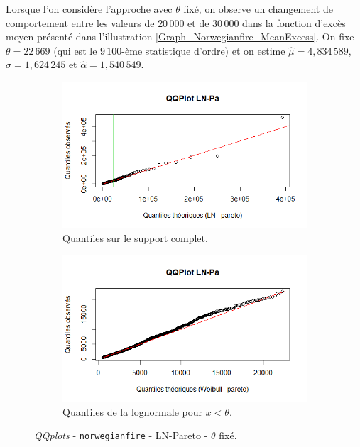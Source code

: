 		Lorsque l'on considère l'approche avec $\theta$ fixé, on observe un changement de comportement entre les valeurs de $20\,000$ et de $30\,000$ dans la fonction d'excès moyen présenté dans l'illustration \ref{Graph_Norwegianfire_MeanExcess}. On fixe $\theta = 22\,669$ (qui est le $9\,100$-ème statistique d'ordre) et on estime $\hat{\mu} =4,834\,589$, $\hat{\sigma}=1,624\,245$ et $\hat{\alpha} = 1,540\,549$.
		
		\begin{figure}[H]
			\begin{center}
				\begin{subfigure}[b]{0.45\textwidth}
					\includegraphics[scale=0.54]{Graphiques/QQ_LN_PA_choix} 
					\caption{Quantiles sur le support complet.} \label{QQplot_LN_Pa_choix}
				\end{subfigure}
				\begin{subfigure}[b]{0.4\textwidth}
					\includegraphics[scale=0.54]{Graphiques/QQ_LN_PA_choix_t1} 
					\caption{Quantiles de la lognormale pour $x<\theta$.} \label{QQplot_LN_Pa_choix_2}
				\end{subfigure}
				\renewcommand{\figurename}{Illustration}
				\caption{\textit{QQplots} - \texttt{norwegianfire} - LN-Pareto - $\theta$ fixé.}
			\end{center}
		\end{figure}
	
